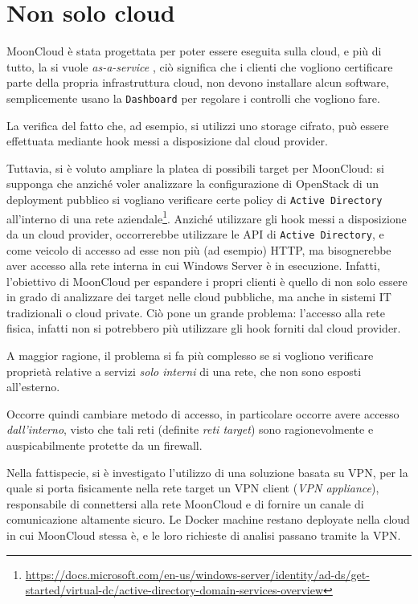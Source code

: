 \section{Non solo cloud}\label{sec:mooncloud-not-only-cloud}
MoonCloud è stata progettata per poter essere eseguita sulla cloud, e più di tutto,
la si vuole \textit{as-a-service}
, ciò significa che i clienti che vogliono
certificare parte della propria infrastruttura cloud, non devono installare alcun
software, semplicemente usano la \texttt{Dashboard} per regolare i controlli
che vogliono fare.

La verifica del fatto che, ad esempio, si utilizzi uno storage cifrato, può essere
effettuata mediante hook messi a disposizione dal cloud provider.

Tuttavia, si è voluto ampliare la platea di possibili target per MoonCloud:
si supponga che anziché voler analizzare la configurazione di OpenStack di
un deployment pubblico si vogliano verificare certe policy di \texttt{Active
Directory} all'interno di una rete aziendale\footnote{\url{https://docs.microsoft.com/en-us/windows-server/identity/ad-ds/get-started/virtual-dc/active-directory-domain-services-overview}}.
Anziché utilizzare gli hook messi a disposizione da un cloud provider, occorrerebbe
utilizzare le API di \texttt{Active Directory}, e come veicolo di accesso ad esse
non più (ad esempio) HTTP, ma bisognerebbe aver accesso alla rete interna
in cui Windows Server è in esecuzione.
Infatti, l'obiettivo di MoonCloud per espandere i propri clienti è quello di non
solo essere in grado di analizzare dei target nelle cloud pubbliche, ma anche in sistemi IT tradizionali
o cloud private.
Ciò pone un grande problema: l'accesso alla rete fisica, infatti non si potrebbero
più utilizzare gli hook forniti dal cloud provider.

A maggior ragione, il problema si fa più complesso se si vogliono verificare
proprietà relative a servizi \textit{solo interni} di una rete, che non sono
esposti all'esterno.

Occorre quindi cambiare metodo di accesso, in particolare occorre avere accesso
\textit{dall'interno}, visto che tali reti (definite \textit{reti target})
sono ragionevolmente e auspicabilmente protette da un firewall.

Nella fattispecie, si è investigato l'utilizzo di una soluzione basata su VPN,
per la quale si porta fisicamente nella rete target un VPN client (\textit{VPN appliance}),
responsabile
di connettersi alla rete MoonCloud e di fornire un canale di comunicazione
altamente sicuro.
Le Docker machine restano deployate nella cloud in cui MoonCloud stessa è, e le
loro richieste di analisi passano tramite la VPN.

